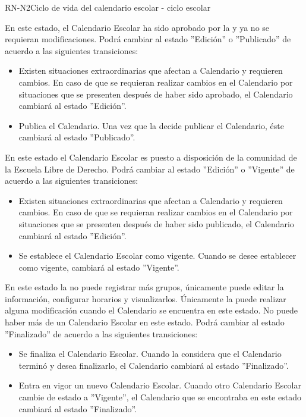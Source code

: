 \begin{BusinessRule}{RN-N2}{Ciclo de vida del calendario escolar - ciclo escolar}
{		
		  En este estado, el Calendario Escolar ha sido aprobado por la  y ya no se requieran modificaciones. Podrá cambiar al estado ''Edición'' o ''Publicado'' de acuerdo a las siguientes transiciones: 
		\begin{itemize}
			\item Existen situaciones extraordinarias que afectan a Calendario y requieren cambios. En caso de que se requieran realizar cambios en el Calendario por situaciones que se presenten después de haber sido aprobado, el Calendario cambiará al estado ''Edición''.
			\item Publica el Calendario. Una vez que la  decide publicar el Calendario, éste cambiará al estado ''Publicado''.
		\end{itemize}
		
		 En este estado el Calendario Escolar es puesto a disposición de la comunidad de la Escuela Libre de Derecho. Podrá cambiar al estado ''Edición'' o ''Vigente'' de acuerdo a las siguientes transiciones: 
		\begin{itemize}
			\item Existen situaciones extraordinarias que afectan a Calendario y requieren cambios. En caso de que se requieran realizar cambios en el Calendario por situaciones que se presenten después de haber sido publicado, el Calendario cambiará al estado ''Edición''.
			\item Se establece el Calendario Escolar como vigente. Cuando se desee establecer como vigente, cambiará al estado ''Vigente''.
		\end{itemize}
		
		 En este estado la  no puede registrar más grupos, únicamente puede editar la información, configurar horarios y visualizarlos. Únicamente la  puede realizar alguna modificación cuando el Calendario se encuentra en este estado. No puede haber más de un Calendario Escolar en este estado. Podrá cambiar al estado ''Finalizado'' de acuerdo a las siguientes transiciones: 
		\begin{itemize}
			\item Se finaliza el Calendario Escolar. Cuando la  considera que el Calendario terminó y desea finalizarlo, el Calendario cambiará al estado ''Finalizado''.
			\item Entra en vigor un nuevo Calendario Escolar. Cuando otro Calendario Escolar cambie de estado a ''Vigente'', el Calendario que se encontraba en este estado cambiará al estado ''Finalizado''.
		\end{itemize}
		
}
\end{BusinessRule}
